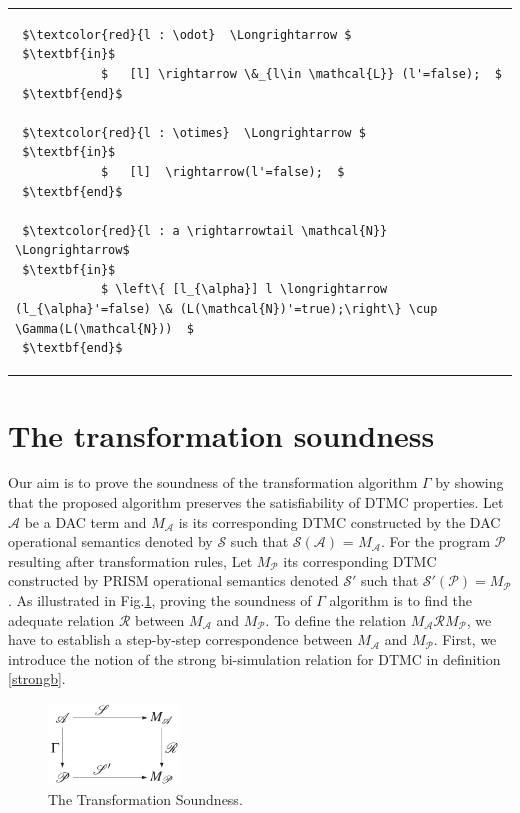 \documentclass[3p,times,procedia,authoryear,round]{elsarticle}
\begin{document}
\begin{table}
\begin{center}
\begin{tabular}{ p{15cm} }
\begin{lstlisting}
 $\textcolor{red}{l : \odot}  \Longrightarrow $
 $\textbf{in}$
			$   [l] \rightarrow \&_{l\in \mathcal{L}} (l'=false);  $	
 $\textbf{end}$	
			
 $\textcolor{red}{l : \otimes}  \Longrightarrow $
 $\textbf{in}$
			$   [l]  \rightarrow(l'=false);  $	
 $\textbf{end}$			
			
 $\textcolor{red}{l : a \rightarrowtail \mathcal{N}}   \Longrightarrow$
 $\textbf{in}$		
			$ \left\{ [l_{\alpha}] l \longrightarrow (l_{\alpha}'=false) \& (L(\mathcal{N})'=true);\right\}	\cup \Gamma(L(\mathcal{N}))  $	
 $\textbf{end}$	
	\end{lstlisting}
			
    \end{tabular}
 \end{center}
     \end{table}
 


\section{The transformation soundness}
\label{sound}


Our aim is to prove the soundness of the transformation algorithm $\Gamma$ by showing that the proposed algorithm preserves the satisfiability of DTMC properties. Let $\mathscr{A}$ be a DAC term and $M_{\mathscr{A}}$ is its corresponding DTMC constructed by the DAC operational semantics denoted by $\mathscr{S}$ such that $\mathscr{S}(\mathscr{A})$ = $M_{\mathscr{A}}$. For the program $\mathscr{P}$ resulting after transformation rules, Let $M_{\mathscr{P}}$ its corresponding DTMC constructed by PRISM operational semantics denoted $\mathscr{S'}$ such that $\mathscr{S'}(\mathscr{P}) = M_{\mathscr{P}}$. As illustrated in Fig.\ref{ts}, proving the soundness of $\Gamma$ algorithm is to find the adequate relation $\mathscr{R}$ between $M_{\mathscr{A}}$ and $M_{\mathscr{P}}$. 
To define the relation $M_{\mathscr{A}}\mathscr{R}M_{\mathscr{P}}$, we have to establish a step-by-step correspondence between $M_{\mathscr{A}}$ and $M_{\mathscr{P}}$. First, we introduce the notion of the strong bi-simulation relation for DTMC \citep{Baier2005149} in definition \ref{strongb}.\\

\begin{figure}[!ht]
	\centering
	\includegraphics[width=100pt]{equivalance.jpg}
	\caption{The Transformation Soundness.}
	\label{ts}
\end{figure}
\end{document}
